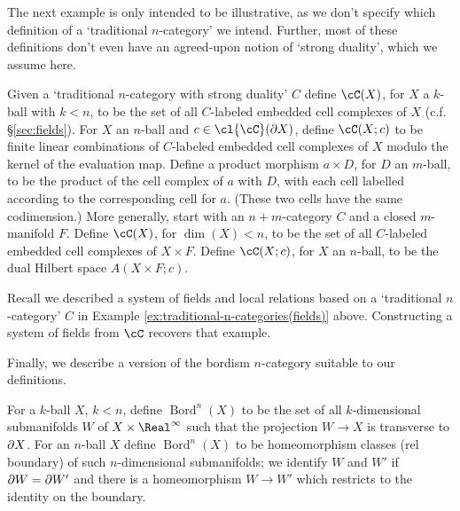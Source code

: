 The next example is only intended to be illustrative, as we don't specify which definition of a `traditional $n$-category' we intend.
Further, most of these definitions don't even have an agreed-upon notion of `strong duality', which we assume here.
\begin{example}
\rm
\label{ex:traditional-n-categories}
Given a `traditional $n$-category with strong duality' $C$
define $\cC(X)$, for $X$ a $k$-ball with $k < n$,
to be the set of all $C$-labeled embedded cell complexes of $X$ (c.f. \S \ref{sec:fields}).
For $X$ an $n$-ball and $c\in \cl{\cC}(\bd X)$, define $\cC(X; c)$ to be finite linear
combinations of $C$-labeled embedded cell complexes of $X$
modulo the kernel of the evaluation map.
Define a product morphism $a\times D$, for $D$ an $m$-ball, to be the product of the cell complex of $a$ with $D$,
with each cell labelled according to the corresponding cell for $a$.
(These two cells have the same codimension.)
More generally, start with an $n{+}m$-category $C$ and a closed $m$-manifold $F$.
Define $\cC(X)$, for $\dim(X) < n$,
to be the set of all $C$-labeled embedded cell complexes of $X\times F$.
Define $\cC(X; c)$, for $X$ an $n$-ball,
to be the dual Hilbert space $A(X\times F; c)$.

Recall we described a system of fields and local relations based on a `traditional $n$-category' 
$C$ in Example \ref{ex:traditional-n-categories(fields)} above.
Constructing a system of fields from $\cC$ recovers that example. 
\end{example}

Finally, we describe a version of the bordism $n$-category suitable to our definitions.


\newcommand{\Bord}{\operatorname{Bord}}
\begin{example}
\label{ex:bord-cat}
\rm
\label{ex:bordism-category}
For a $k$-ball $X$, $k<n$, define $\Bord^n(X)$ to be the set of all $k$-dimensional
submanifolds $W$ of $X\times \Real^\infty$ such that the projection $W \to X$ is transverse
to $\partial X$.
For an $n$-ball $X$ define $\Bord^n(X)$ to be homeomorphism classes (rel boundary) of such $n$-dimensional submanifolds;
we identify $W$ and $W'$ if $\partial W = \partial W'$ and there is a homeomorphism
$W \to W'$ which restricts to the identity on the boundary.
\end{example}

